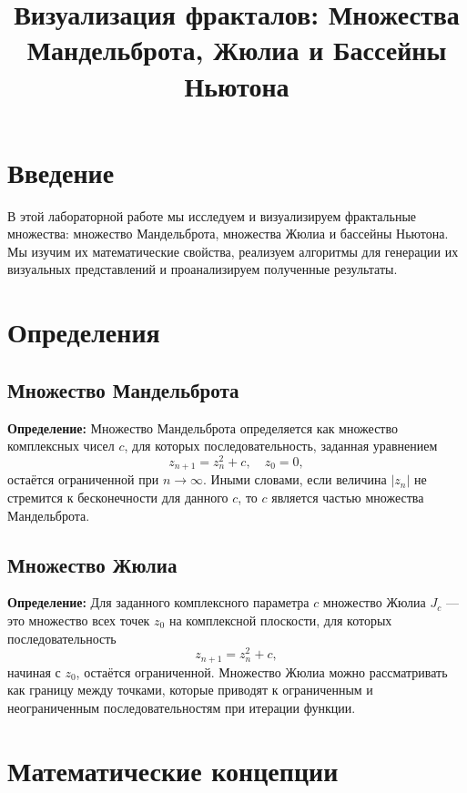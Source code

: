 \documentclass{article}
\title{Визуализация фракталов: Множества Мандельброта, Жюлиа и Бассейны Ньютона}
\author{}
\date{}
\begin{document}
	
	\maketitle
	\newpage
	\tableofcontents
	\newpage
	
	\section{Введение}
	В этой лабораторной работе мы исследуем и визуализируем фрактальные множества: множество Мандельброта, множества Жюлиа и бассейны Ньютона. Мы изучим их математические свойства, реализуем алгоритмы для генерации их визуальных представлений и проанализируем полученные результаты.
	
	\section{Определения}
	
	\subsection{Множество Мандельброта}
	\textbf{Определение:} Множество Мандельброта определяется как множество комплексных чисел $c$, для которых последовательность, заданная уравнением
	\begin{equation}
		z_{n+1} = z_n^2 + c, \quad z_0 = 0,
	\end{equation}
	остаётся ограниченной при $n \to \infty$. Иными словами, если величина $|z_n|$ не стремится к бесконечности для данного $c$, то $c$ является частью множества Мандельброта.
	
	\subsection{Множество Жюлиа}
	\textbf{Определение:} Для заданного комплексного параметра $c$ множество Жюлиа $J_c$ — это множество всех точек $z_0$ на комплексной плоскости, для которых последовательность
	\begin{equation}
		z_{n+1} = z_n^2 + c,
	\end{equation}
	начиная с $z_0$, остаётся ограниченной. Множество Жюлиа можно рассматривать как границу между точками, которые приводят к ограниченным и неограниченным последовательностям при итерации функции.
	
	\section{Математические концепции}
	
\end{document}
